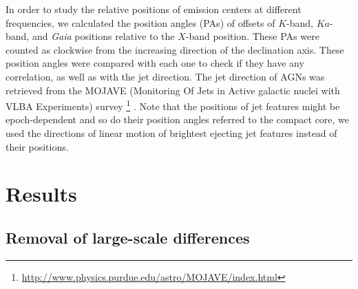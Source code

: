 \documentclass[referee]{aa}        %
\begin{document}
   In order to study the relative positions of emission centers at different frequencies, we calculated the position angles (PAs) of offsets of $K$-band, $Ka$-band, and \textit{Gaia} positions relative to the $X$-band position.
   These PAs were counted as clockwise from the increasing direction of the declination axis.
   These position angles were compared with each one to check if they have any correlation, as well as with the jet direction.
   The jet direction of AGNs was retrieved from the MOJAVE (Monitoring Of Jets in Active galactic nuclei with VLBA Experiments) survey \footnote{\url{http://www.physics.purdue.edu/astro/MOJAVE/index.html}} \citep[][]{2019ApJ...874...43L}.
   Note that the positions of jet features might be epoch-dependent and so do their position angles referred to the compact core, we used the directions of linear motion of brightest ejecting jet features instead of their positions.


\section{Results}    \label{sec:result}


\subsection{Removal of large-scale differences}    \label{subsec:remove-sys}
\end{document}
